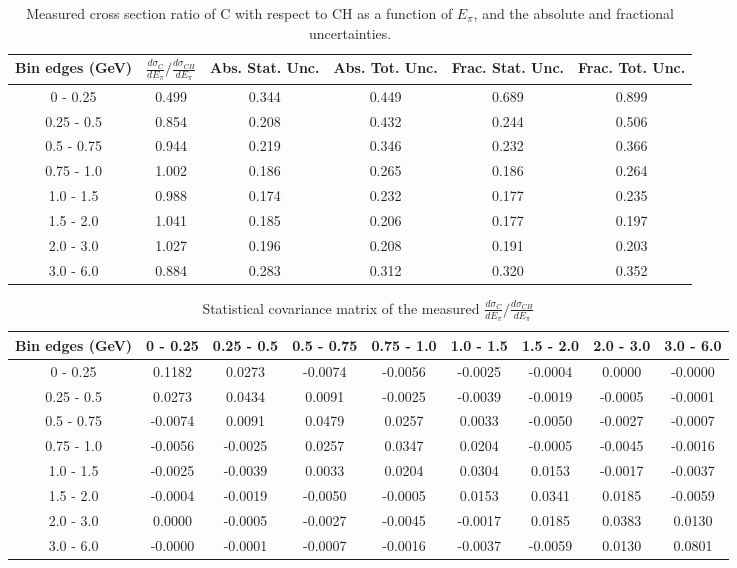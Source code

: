 \documentclass[aps,prl,twocolumn,superscriptaddress,nofootinbib]{revtex4-1}
\begin{document}
\begin{table}[h!]
  \centering
  \caption{Measured cross section ratio of C with respect to CH as a function
  of $E_{\pi}$,  and the absolute and fractional uncertainties.}
    \begin{tabular}{c||c||c|c||c|c}
      Bin edges (GeV) & $\frac{d\sigma_{C}}{dE_{\pi}}/\frac{d\sigma_{CH}}{dE_{\pi}}$ & Abs. Stat. Unc. & Abs. Tot. Unc. & Frac. Stat. Unc. & Frac. Tot. Unc. \\
      \hline\hline
        0 - 0.25 & 0.499 & 0.344 & 0.449 & 0.689 & 0.899 \\
      0.25 - 0.5 & 0.854 & 0.208 & 0.432 & 0.244 & 0.506 \\
      0.5 - 0.75 & 0.944 & 0.219 & 0.346 & 0.232 & 0.366 \\
      0.75 - 1.0 & 1.002 & 0.186 & 0.265 & 0.186 & 0.264 \\
       1.0 - 1.5 & 0.988 & 0.174 & 0.232 & 0.177 & 0.235 \\
       1.5 - 2.0 & 1.041 & 0.185 & 0.206 & 0.177 & 0.197 \\
       2.0 - 3.0 & 1.027 & 0.196 & 0.208 & 0.191 & 0.203 \\
       3.0 - 6.0 & 0.884 & 0.283 & 0.312 & 0.320 & 0.352 \\
    \end{tabular}
  \label{table:EpiXSecRatio_C}
\end{table}

\begin{table}[h!]
  \centering
  \caption{Statistical covariance matrix of the measured $\frac{d\sigma_{C}}{dE_{\pi}}/\frac{d\sigma_{CH}}{dE_{\pi}}$}
    \begin{tabular}{c||cccccccc}
      Bin edges (GeV) & 0 - 0.25 & 0.25 - 0.5 & 0.5 - 0.75 & 0.75 - 1.0 & 1.0 - 1.5 & 1.5 - 2.0 & 2.0 - 3.0 & 3.0 - 6.0 \\
\hline \hline
        0 - 0.25 &  0.1182 &  0.0273 & -0.0074 & -0.0056 & -0.0025 & -0.0004 &  0.0000 & -0.0000 \\
      0.25 - 0.5 &  0.0273 &  0.0434 &  0.0091 & -0.0025 & -0.0039 & -0.0019 & -0.0005 & -0.0001 \\
      0.5 - 0.75 & -0.0074 &  0.0091 &  0.0479 &  0.0257 &  0.0033 & -0.0050 & -0.0027 & -0.0007 \\
      0.75 - 1.0 & -0.0056 & -0.0025 &  0.0257 &  0.0347 &  0.0204 & -0.0005 & -0.0045 & -0.0016 \\
       1.0 - 1.5 & -0.0025 & -0.0039 &  0.0033 &  0.0204 &  0.0304 &  0.0153 & -0.0017 & -0.0037 \\
       1.5 - 2.0 & -0.0004 & -0.0019 & -0.0050 & -0.0005 &  0.0153 &  0.0341 &  0.0185 & -0.0059 \\
       2.0 - 3.0 &  0.0000 & -0.0005 & -0.0027 & -0.0045 & -0.0017 &  0.0185 &  0.0383 &  0.0130 \\
       3.0 - 6.0 & -0.0000 & -0.0001 & -0.0007 & -0.0016 & -0.0037 & -0.0059 &  0.0130 &  0.0801 \\
    \end{tabular}
  \label{tablecov:C_Statistical_Epi}
\end{table}
\end{document}
